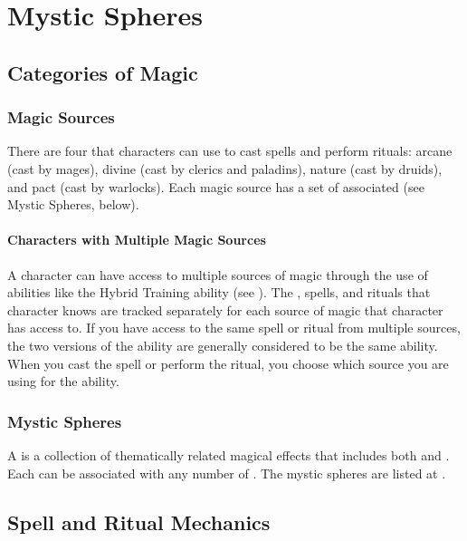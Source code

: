 \chapter{Mystic Spheres}\label{Mystic Spheres}

\section{Categories of Magic}

    \subsection{Magic Sources}
        There are four  that characters can use to cast spells and perform rituals: arcane (cast by mages), divine (cast by clerics and paladins), nature (cast by druids), and pact (cast by warlocks).
        Each magic source has a set of associated  (see Mystic Spheres, below).

        \subsubsection{Characters with Multiple Magic Sources}
            A character can have access to multiple sources of magic through the use of abilities like the Hybrid Training ability (see ).
            The , spells, and rituals that character knows are tracked separately for each source of magic that character has access to.
            If you have access to the same spell or ritual from multiple sources, the two versions of the ability are generally considered to be the same ability.
            When you cast the spell or perform the ritual, you choose which source you are using for the ability.

    \subsection{Mystic Spheres}
        A  is a collection of thematically related magical effects that includes both  and .
        Each  can be associated with any number of .
        The mystic spheres are listed at .

\section{Spell and Ritual Mechanics}\label{Spell and Ritual Mechanics}

